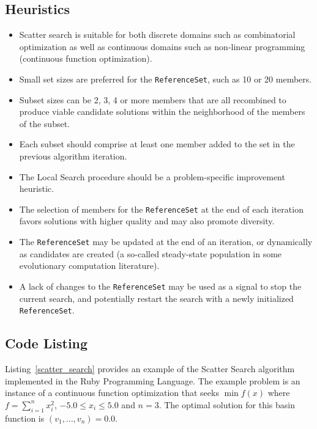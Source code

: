 \subsection{Heuristics}
\begin{itemize}
	\item Scatter search is suitable for both discrete domains such as combinatorial optimization as well as continuous domains such as non-linear programming (continuous function optimization).
	\item Small set sizes are preferred for the \texttt{Reference\-Set}, such as 10 or 20 members.
	\item Subset sizes can be 2, 3, 4 or more members that are all recombined to produce viable candidate solutions within the neighborhood of the members of the subset.
	\item Each subset should comprise at least one member added to the set in the previous algorithm iteration.
	\item The Local Search procedure should be a problem-specific improvement heuristic. 
	\item The selection of members for the \texttt{Reference\-Set} at the end of each iteration favors solutions with higher quality and may also promote diversity.
	\item The \texttt{Reference\-Set} may be updated at the end of an iteration, or dynamically as candidates are created (a so-called steady-state population in some evolutionary computation literature).
	\item A lack of changes to the \texttt{Reference\-Set} may be used as a signal to stop the current search, and potentially restart the search with a newly initialized \texttt{Reference\-Set}.	
\end{itemize}

\subsection{Code Listing}
Listing~\ref{scatter_search} provides an example of the Scatter Search algorithm implemented in the Ruby Programming Language. 
The example problem is an instance of a continuous function optimization that seeks $\min f(x)$ where $f=\sum_{i=1}^n x_{i}^2$, $-5.0\leq x_i \leq 5.0$ and $n=3$. The optimal solution for this basin function is $(v_1,\ldots,v_{n})=0.0$.

